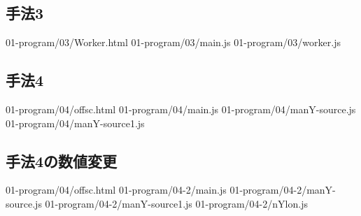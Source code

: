 \documentclass[a4j,12pt]{jsarticle}
\begin{document}
\subsection{手法3}
 {01-program/03/Worker.html}
\newpage
 {01-program/03/main.js}
\newpage
 {01-program/03/worker.js}
\newpage

\subsection{手法4}
 {01-program/04/offsc.html}
\newpage
 {01-program/04/main.js}
\newpage
 {01-program/04/manY-source.js}
\newpage
 {01-program/04/manY-source1.js}
\newpage

\subsection{手法4の数値変更}
 {01-program/04/offsc.html}
\newpage
 {01-program/04-2/main.js}
\newpage
 {01-program/04-2/manY-source.js}
\newpage
 {01-program/04-2/manY-source1.js}
\newpage
 {01-program/04-2/nYlon.js}
\newpage
\end{document}
